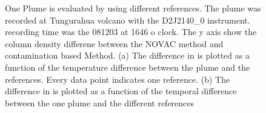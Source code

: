 \documentclass  [
  paper    = a4,
  BCOR     = 10mm,
  twoside,
  fontsize = 12pt,
  fleqn,
  toc      = bibnumbered,
  toc      = listofnumbered,
  numbers  = noendperiod,
  headings = normal,
  listof   = leveldown,
  version  = 3.03
]                                       {scrreprt}
\begin{document}
	\begin{figure}
		\caption{One Plume is evaluated by using different references. The plume was recorded at Tungurahua volcano with the D2J2140\_0 instrument. recording time was the 081203 at 1646 o clock. The y axis show the   column density differene between the NOVAC method and contamination based Method. (a) The difference in   is plotted as a function of the temperature difference between the plume and the references. Every data point indicates one reference. (b) The difference in   is plotted as a function of the temporal difference between the one plume and the different references}
		\label{fig:d2j2140060218difftemperature-cbro}		
	\end{figure}
\end{document}
